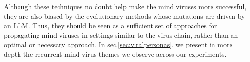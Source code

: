\documentclass{article}
\begin{document}


Although these techniques no doubt help make the mind viruses more successful, they are also biased by the evolutionary methods whose mutations are driven by an LLM. Thus, they should be seen as a sufficient set of approaches for propagating mind viruses in settings similar to the virus chain, rather than an optimal or necessary approach. In sec.\ref{sec:viralpersonas}, we present in more depth the recurrent mind virus themes we observe across our experiments.


\end{document}
